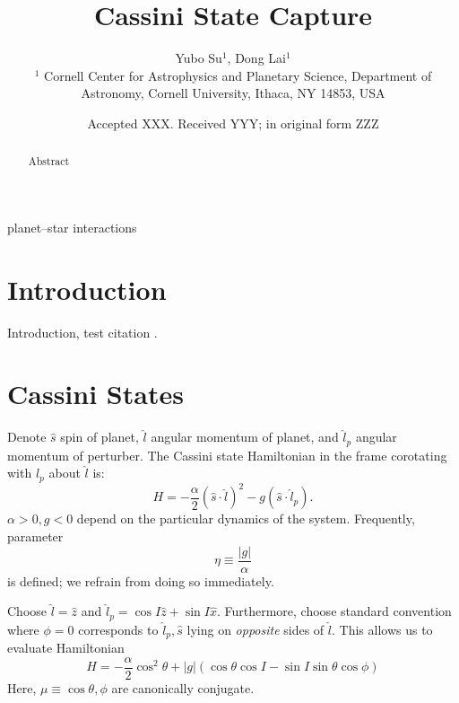 \documentclass[
        fleqn,
        usenatbib,
    ]{mnras}
\title[Cassini State Capture]{Cassini State Capture}
\author[Y. Su et\ al.]{
Yubo Su$^1$,
Dong Lai$^1$
\\
$^1$ Cornell Center for Astrophysics and Planetary Science, Department of
Astronomy, Cornell University, Ithaca, NY 14853, USA
}
\date{Accepted XXX\@. Received YYY\@; in original form ZZZ}
\newcommand*{\abs}[1]{\left|#1\right|}
\newcommand*{\p}[1]{\left(#1\right)}
\begin{document}
\label{firstpage}
\pagerange{\pageref{firstpage}--\pageref{lastpage}}
\renewcommand*{\sectionautorefname}{Section}
\maketitle


\begin{abstract}
    Abstract
\end{abstract}

\begin{keywords}
planet--star interactions %
\end{keywords}

\section{Introduction}

Introduction, test citation \citep{henrard1982}.

\section{Cassini States}\label{s:cs}

Denote $\hat{s}$ spin of planet, $\hat{l}$ angular momentum of planet, and
$\hat{l}_p$ angular momentum of perturber. The Cassini state Hamiltonian in the
frame corotating with $\hat{l}_p$ about $\hat{l}$ is:
\begin{equation}
    H = -\frac{\alpha}{2}\p{\hat{s} \cdot \hat{l}}^2
        -g \p{\hat{s} \cdot \hat{l}_p}.
\end{equation}
$\alpha > 0, g < 0$ depend on the particular dynamics of the system. Frequently,
parameter
\begin{equation}
    \eta \equiv \frac{\abs{g}}{\alpha} \label{eq:eta}
\end{equation}
is defined; we refrain from doing so immediately.

Choose $\hat{l} = \hat{z}$ and $\hat{l}_p = \cos I \hat{z} + \sin I \hat{x}$.
Furthermore, choose standard convention where $\phi = 0$ corresponds to
$\hat{l}_p, \hat{s}$ lying on \emph{opposite} sides of $\hat{l}$. This allows us
to evaluate Hamiltonian
\begin{equation}
    H = -\frac{\alpha}{2}\cos^2\theta
        + \abs{g} \p{\cos \theta \cos I - \sin I \sin \theta \cos \phi}
        \label{eq:H}
\end{equation}
Here, $\mu \equiv \cos \theta, \phi$ are canonically conjugate.
\end{document}
